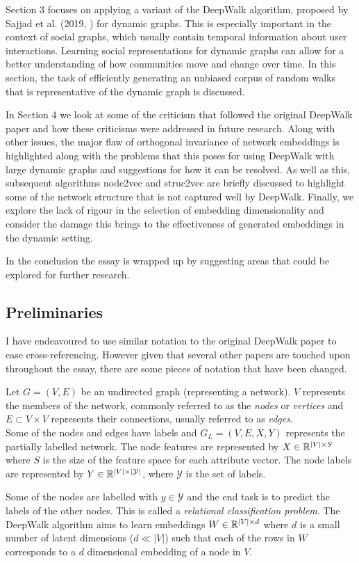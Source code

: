 \documentclass[a4paper]{article}
\begin{document}
Section 3 focuses on applying a variant of the DeepWalk algorithm, proposed
by Sajjad et al. (2019, \cite{sajjad2019}) for dynamic graphs. This is especially
important in the context of social graphs, which usually contain temporal information
about user interactions. Learning social representations for dynamic graphs can allow for a better understanding of how
communities move and change over time. In this section, the task of efficiently generating an unbiased corpus of random walks that is representative of
the dynamic graph is discussed.

In Section 4 we look at some of the criticism that followed the original DeepWalk paper and how these criticisms
were addressed in future research. Along with other issues, the major flaw of orthogonal invariance of network embeddings is highlighted along with the problems that this poses for using DeepWalk with large dynamic graphs and suggestions for how it can be resolved.
As well as this, subsequent algorithms node2vec and struc2vec are briefly discussed to highlight some of the network structure that is not captured well by DeepWalk. Finally, we explore the lack of rigour in the selection of embedding dimensionality and consider the damage this brings to the effectiveness of generated embeddings in the dynamic setting.

In the conclusion the essay is wrapped up by suggesting areas that could be explored for further research.

\subsection{Preliminaries}
I have endeavoured to use similar notation to the original DeepWalk paper to ease
cross-referencing. However given that several other papers are touched upon
throughout the essay, there are some pieces of notation that have been changed.

\begin{definition}
  Let $G = (V, E)$ be an undirected graph (representing a network). $V$ represents the
  members of the network, commonly referred to as the \textit{nodes} or \textit{vertices} and $E \subset V
  \times V$ represents their connections, usually referred to as
  \textit{edges}.\\
  Some of the nodes and edges have labels and $G_L = (V, E, X, Y)$ represents the
  partially labelled network. The node features are represented by $X \in \R^{|V| \times S}$ where $S$ is the size of
  the feature space for each attribute vector. The node labels are represented by $Y \in \R^{|V|
    \times|\mathcal{Y}|}$, where $\mathcal{Y}$ is the set of labels.
\end{definition}
Some of the nodes are labelled with $y \in \mathcal{Y}$ and the end task is to
predict the labels of the other nodes. This is called a \textit{relational
  classification problem}. The DeepWalk algorithm aims to learn embeddings $W \in \R^{|V| \times d}$ where $d$ is a small number
of latent dimensions ($d \ll |V|$) such that each of the rows in $W$
corresponds to a $d$ dimensional embedding of a node in $V$.
\end{document}
